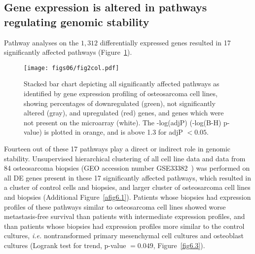 \subsection{Gene expression is altered in pathways regulating genomic stability}
Pathway analyses on the $1,312$ differentially expressed genes resulted in 17 significantly affected pathways (Figure~\ref{fig6.2}).
%
\begin{figure}[htbp]
	\centering
	\texttt{[image: figs06/fig2col.pdf]}	%
	\caption{Stacked bar chart depicting all significantly affected pathways as identified by gene expression profiling of osteosarcoma cell lines, showing percentages of downregulated (green), not significantly altered (gray), and upregulated (red) genes, and genes which were not present on the microarray (white). The -log(adjP) (-log(B-H) p-value) is plotted in orange, and is above 1.3 for adjP $<0.05$.}			%
	\label{fig6.2}
\end{figure}
%
Fourteen out of these 17 pathways play a direct or indirect role in genomic stability. Unsupervised hierarchical clustering of all cell line data and data from 84 osteosarcoma biopsies (GEO accession number GSE33382~\cite{kuijjer2012identification}) was performed on all DE genes present in these 17 significantly affected pathways, which resulted in a cluster of control cells and biopsies, and larger cluster of osteosarcoma cell lines and biopsies (Additional Figure~\ref{afig6.1}). Patients whose biopsies had expression profiles of these pathways similar to osteosarcoma cell lines showed worse metastasis\hyp{}free survival than patients with intermediate expression profiles, and than patients whose biopsies had expression profiles more similar to the control cultures, {\it i.e.} nontransformed primary mesenchymal cell cultures and osteoblast cultures (Logrank test for trend, p-value $=0.049$, Figure~\ref{fig6.3}).
%
